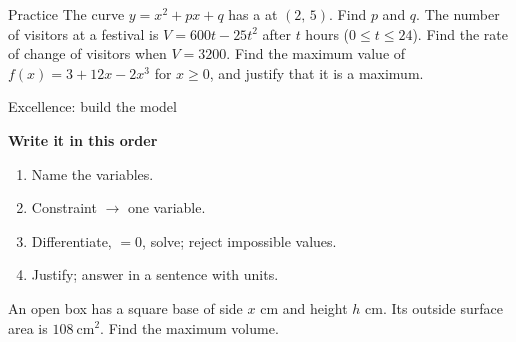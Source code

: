 \documentclass[aspectratio=169,11pt,t,xcolor=table]{beamer}
\begin{document}
\begin{frame}{Practice}\relax
{} The curve $y=x^{2}+px+q$ has a \tturn at $(2,\,5)$. Find $p$ and $q$.
\vskip4mm
 The number of visitors at a festival is $V=600t-25t^{2}$ after $t$ hours ($0\le t\le24$). Find the rate of change of visitors when $V=3200$.
\vskip4mm
 Find the maximum value of $f(x)=3+12x-2x^{3}$ for $x\ge0$, and justify that it is a maximum.
\end{frame}

\begin{frame}{Excellence: build the model}\relax
{\sEmph\bfseries Write it in this order\par}\vskip1mm
\begin{enumerate}
\item Name the variables.
\item Constraint $\to$ one variable.
\item Differentiate, $=0$, solve; reject impossible values.
\item Justify; answer in a sentence with units.
\end{enumerate}
\vskip2mm
 An open box has a square base of side $x$ cm and height $h$ cm. Its outside surface area is $108\ \mathrm{cm}^{2}$. Find the maximum volume.
\end{frame}
\end{document}
